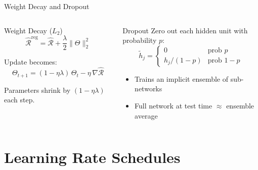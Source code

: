 \documentclass[aspectratio=169, professionalfonts]{beamer}
\begin{document}
\begin{frame}{Weight Decay and Dropout}

\begin{columns}[t]
\begin{block}{Weight Decay ($L_2$)}
$$\hat{\mathcal{R}}^{\text{reg}}
  = \hat{\mathcal{R}} + \frac{\lambda}{2}\|\Theta\|_2^2$$

Update becomes:
$$\Theta_{t+1}
  = (1-\eta\lambda)\,\Theta_t
  - \eta\,\nabla\hat{\mathcal{R}}$$

Parameters shrink by $(1-\eta\lambda)$ each step.
\end{block}

\begin{block}{Dropout}
Zero out each hidden unit with probability $p$:
$$\tilde{h}_j = \begin{cases}
  0 & \text{prob } p \\
  h_j/(1-p) & \text{prob } 1-p
\end{cases}$$

\begin{itemize}
  \item Trains an implicit ensemble of sub-networks
  \item Full network at test time $\approx$ ensemble average
\end{itemize}
\end{block}
\end{columns}

\end{frame}

\section{Learning Rate Schedules}
\end{document}
